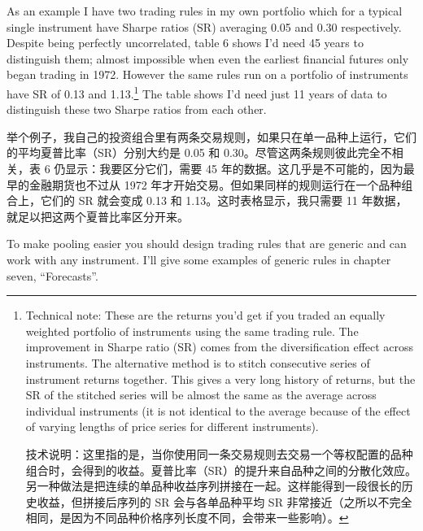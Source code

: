 \bipairgap

\begin{englishblock} As an example I have two trading rules in my own portfolio which for a typical single instrument have Sharpe ratios (SR) averaging 0.05 and 0.30 respectively. Despite being perfectly uncorrelated, table 6 shows I'd need 45 years to distinguish them; almost impossible when even the earliest financial futures only began trading in 1972. However the same rules run on a portfolio of instruments have SR of 0.13 and 1.13.\footnote{Technical note: These are the returns you'd get if you traded an equally weighted portfolio of instruments using the same trading rule. The improvement in Sharpe ratio (SR) comes from the diversification effect across instruments. The alternative method is to stitch consecutive series of instrument returns together. This gives a very long history of returns, but the SR of the stitched series will be almost the same as the average across individual instruments (it is not identical to the average because of the effect of varying lengths of price series for different instruments). \par 技术说明：这里指的是，当你使用同一条交易规则去交易一个等权配置的品种组合时，会得到的收益。夏普比率（SR）的提升来自品种之间的分散化效应。另一种做法是把连续的单品种收益序列拼接在一起。这样能得到一段很长的历史收益，但拼接后序列的 SR 会与各单品种平均 SR 非常接近（之所以不完全相同，是因为不同品种价格序列长度不同，会带来一些影响）。} The table shows I'd need just 11 years of data to distinguish these two Sharpe ratios from each other. \end{englishblock}

\begin{chineseblock}举个例子，我自己的投资组合里有两条交易规则，如果只在单一品种上运行，它们的平均夏普比率（SR）分别大约是 0.05 和 0.30。尽管这两条规则彼此完全不相关，表 6 仍显示：我要区分它们，需要 45 年的数据。这几乎是不可能的，因为最早的金融期货也不过从 1972 年才开始交易。但如果同样的规则运行在一个品种组合上，它们的 SR 就会变成 0.13 和 1.13。这时表格显示，我只需要 11 年数据，就足以把这两个夏普比率区分开来。\end{chineseblock}

\bipairgap

\begin{englishblock} To make pooling easier you should design trading rules that are generic and can work with any instrument. I'll give some examples of generic rules in chapter seven, ``Forecasts''. \end{englishblock}


